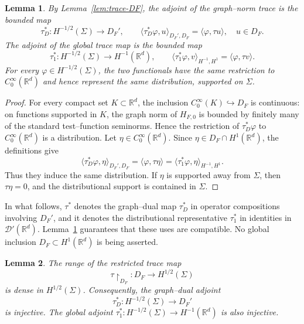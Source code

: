 \documentclass[a4paper,11pt]{article}
\numberwithin{equation}{section}
\newtheorem{lem}{Lemma}[section]
\theoremstyle{remark}
\theoremstyle{definition}
\theoremstyle{remark}
\begin{document}
\begin{lem}\label{lem:tau-star}
By Lemma~\ref{lem:trace-DF}, the adjoint of the graph--norm trace is the bounded map
$$
\tau_D^*:H^{-1/2}(\Sigma)\to D_F',
\qquad
\langle\tau_D^*\varphi,u\rangle_{D_F',D_F}
=
\langle\varphi,\tau u\rangle,
\quad u\in D_F.
$$
The adjoint of the global trace map is the bounded map
$$
\tau_1^*:H^{-1/2}(\Sigma)\to H^{-1}(\mathbb R^d),
\qquad
\langle\tau_1^*\varphi,v\rangle_{H^{-1},H^1}
=
\langle\varphi,\tau v\rangle.
$$
For every $\varphi\in H^{-1/2}(\Sigma)$, the two functionals have the same restriction to $C_0^\infty(\mathbb R^d)$ and hence represent the same distribution, supported on $\Sigma$.
\end{lem}

\begin{proof}
For every compact set $K\subset\mathbb R^d$, the inclusion $C_0^\infty(K)\hookrightarrow D_F$ is continuous: on functions supported in $K$, the graph norm of $H_{F,0}$ is bounded by finitely many of the standard test--function seminorms.
Hence the restriction of $\tau_D^*\varphi$ to $C_0^\infty(\mathbb R^d)$ is a distribution.
Let $\eta\in C_0^\infty(\mathbb R^d)$.
Since $\eta\in D_F\cap H^1(\mathbb R^d)$, the definitions give
$$
\langle\tau_D^*\varphi,\eta\rangle_{D_F',D_F}
=
\langle\varphi,\tau\eta\rangle
=
\langle\tau_1^*\varphi,\eta\rangle_{H^{-1},H^1}.
$$
Thus they induce the same distribution.
If $\eta$ is supported away from $\Sigma$, then $\tau\eta=0$, and the distributional support is contained in $\Sigma$.
\end{proof}

In what follows, $\tau^*$ denotes the graph--dual map $\tau_D^*$ in operator compositions involving $D_F'$, and it denotes the distributional representative $\tau_1^*$ in identities in $\mathcal D'(\mathbb R^d)$.
Lemma~\ref{lem:tau-star} guarantees that these uses are compatible.
No global inclusion $D_F\subset H^1(\mathbb R^d)$ is being asserted.

\begin{lem}\label{lem:tau-dense}
The range of the restricted trace map
$$
\tau\upharpoonright_{D_F}:D_F\to H^{1/2}(\Sigma)
$$
is dense in $H^{1/2}(\Sigma)$.
Consequently, the graph--dual adjoint
$$
\tau_D^*:H^{-1/2}(\Sigma)\to D_F'
$$
is injective.
The global adjoint $\tau_1^*:H^{-1/2}(\Sigma)\to H^{-1}(\mathbb R^d)$ is also injective.
\end{lem}
\end{document}
